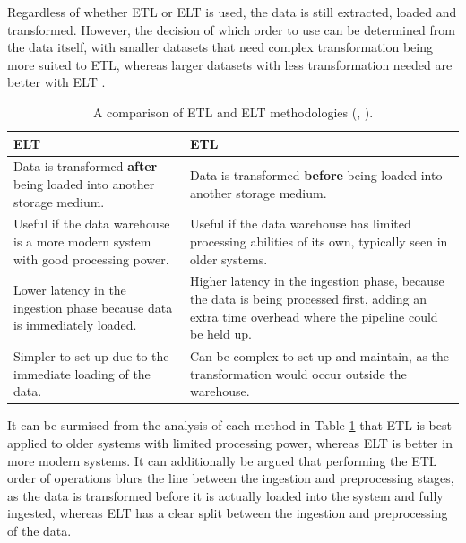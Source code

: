 \documentclass[12pt]{report}
\begin{document}
Regardless of whether ETL or ELT is used, the data is still extracted, loaded and transformed. However,
the decision of which order to use can be determined from the data itself, with smaller datasets that need 
complex transformation being more suited to ETL, whereas larger datasets with less transformation needed 
are better with ELT \autocite{smallcombe_etl_nodate}.

\begin{table}[H]
    \centering
        \begin{tabular}{ |p{}| p{}|}
            \hline
            \cellcolor{blue!25}ELT & \cellcolor{blue!25}ETL\\
            \hline
            Data is transformed \textbf{after} being loaded into another storage medium.
            & Data is transformed \textbf{before} being loaded into another storage medium. \\
            \hline
            Useful if the data warehouse is a more modern system with good processing power.
            & Useful if the data warehouse has limited processing abilities of its own,
            typically seen in older systems.\\
            \hline
            Lower latency in the ingestion phase because data is immediately loaded. 
            & Higher latency in the ingestion phase, because the data is being processed first, 
            adding an extra time overhead where the pipeline could be held up.\\
            \hline 
            Simpler to set up due to the immediate loading of the data.
            & Can be complex to set up and maintain, as the transformation would occur outside the warehouse.\\
            \hline
    \end{tabular}
    \caption{A comparison of ETL and ELT methodologies (\textcite{bartley_etl_2024}, \textcite{aws_etl_nodate}).}\label{tab:ELT-ETL}
\end{table}

It can be surmised from the analysis of each method in Table \ref{tab:ELT-ETL} that ETL is best applied 
to older systems with limited processing power, whereas ELT is better in more modern systems. 
It can additionally be argued that performing the ETL order of operations blurs the line between the ingestion and 
preprocessing stages, as the data is transformed before it is actually loaded into the system and
fully ingested, whereas ELT has a clear split between the ingestion and preprocessing of the data. 
\end{document}
